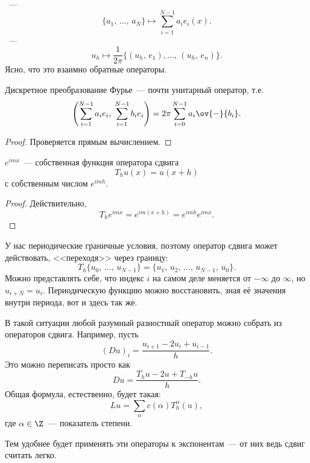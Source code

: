 \documentclass{trlnotes}
\begin{document}
    \begin{de}
        ~---
        \[
            \{a_1, \, \ldots, \, a_N\} \mapsto \sum\limits_{i = 1}^{N-1} a_i e_i(x).
        \]
        ~---
        \[
            u_h \mapsto \dfrac{1}{2\pi}\big\{(u_h, \, e_1), \ldots, \, (u_h, \, e_n)\big\}.
        \]
        Ясно, что это взаимно обратные операторы.
    \end{de}

    \begin{st}
        Дискретное преобразование Фурье~--- почти унитарный оператор, т.е. 
        \[
            \left(\sum\limits_{i = 1}^{N - 1} a_i e_i, \; \sum\limits_{i = 1}^{N - 1} b_i e_i\right) = 2 \pi \sum_{i = 0}^{N - 1} a_i \ov{-}{b_i}.
        \]
        \begin{proof}
            Проверяется прямым вычислением.
        \end{proof}
    \end{st}

    \begin{st}
        $e^{imx}$~--- собственная функция оператора сдвига
        \[
            T_h u(x) = u(x + h)
        \]
        с собственным числом $e^{imh}$.
        \begin{proof}
            Действительно,
            \[
                T_h e^{imx} = e^{im(x + h)} = e^{imh} e^{imx}.
            \]
        \end{proof}
    \end{st}

    \begin{rem}
        У нас периодические граничные условия, поэтому оператор сдвига может действовать, <<переходя>> через границу:
        \[
            T_h \{u_0, \, \ldots, \, u_{N - 1}\} = \{u_{1}, \, u_2, \, \ldots, \, u_{N-1}, \, u_0\}.
        \]
        Можно представлять себе, что индекс $i$ на самом деле меняется от $-\infty$ до $\infty$, но $u_{i + N} = u_i$. Периодическую функцию можно восстановить, зная её значения внутри периода, вот и здесь так же.
    \end{rem}

    \begin{rem}
        В такой ситуации любой разумный разностный оператор можно собрать из операторов сдвига. Например, пусть
        \[
            (Du)_i = \dfrac{u_{i + 1} - 2u_i + u_{i - 1}}{h}.
        \]
        Это можно переписать просто как
        \[
            Du = \dfrac{T_hu - 2u + T_{-h}u}{h}.
        \]
        Общая формула, естественно, будет такая:
        \[
            Lu = \sum\limits_{\alpha} c(\alpha) T_h^{\alpha}(u),
        \]
        где $\alpha \in \Z$~--- показатель степени.

        Тем удобнее будет применять эти операторы к экспонентам~--- от них ведь сдвиг считать легко.
    \end{rem}
\end{document}
